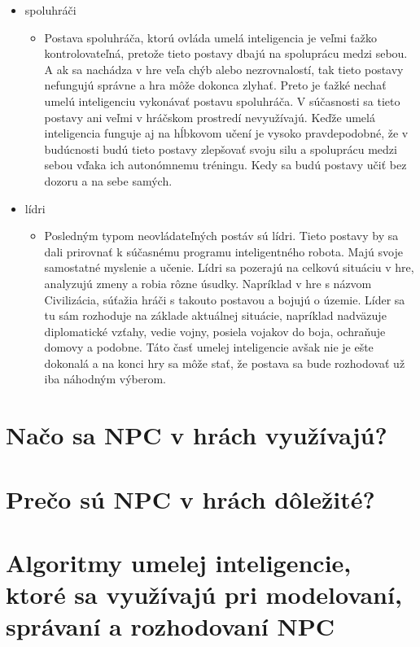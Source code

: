 \documentclass[10pt,twoside,slovak,a4paper]{article}
\begin{document}
\begin{itemize}
\begin{itemize}
	\end{itemize}
\item spoluhráči
	\begin{itemize}
	\item Postava spoluhráča, ktorú ovláda umelá inteligencia je veľmi ťažko kontrolovateľná, pretože tieto postavy dbajú na spoluprácu medzi sebou. A ak sa nachádza v hre veľa chýb alebo nezrovnalostí, tak tieto postavy nefungujú správne a hra môže dokonca zlyhať. Preto je ťažké nechať umelú inteligenciu vykonávať postavu spoluhráča. V súčasnosti sa tieto postavy ani veľmi v hráčskom prostredí nevyužívajú. Keďže umelá inteligencia funguje aj na hĺbkovom učení je vysoko pravdepodobné, že v budúcnosti budú tieto postavy zlepšovať svoju silu a spoluprácu medzi sebou vďaka ich autonómnemu tréningu. Kedy sa budú postavy učiť bez dozoru a na sebe samých. 
	\end{itemize}
\item lídri
	\begin{itemize}
	\item Posledným typom neovládateľných postáv sú lídri. Tieto postavy by sa dali prirovnať k súčasnému programu inteligentného robota. Majú svoje samostatné myslenie a učenie. Lídri sa pozerajú na celkovú situáciu v hre, analyzujú zmeny a robia rôzne úsudky. Napríklad v hre s názvom Civilizácia, súťažia hráči s takouto postavou a bojujú o územie. Líder sa tu sám rozhoduje na základe aktuálnej situácie, napríklad nadväzuje diplomatické vzťahy, vedie vojny, posiela vojakov do boja, ochraňuje domovy a podobne. Táto časť umelej inteligencie avšak nie je ešte dokonalá a na konci hry sa môže stať, že postava sa bude rozhodovať už iba náhodným výberom. 
	\end{itemize}
\end{itemize}

\section{Načo sa NPC v hrách využívajú?} \label{ina}


\section{Prečo sú NPC v hrách dôležité?} \label{dolezita}


\section{Algoritmy umelej inteligencie, ktoré sa využívajú pri modelovaní, správaní a rozhodovaní NPC} \label{dolezitejsia}
\end{document}
